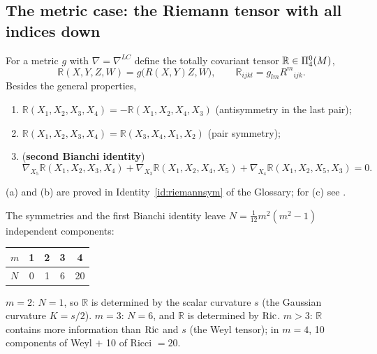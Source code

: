 \subsection{The metric case: the Riemann tensor with all indices down}
\begin{formal}
For a metric $g$ with $\nabla=\nabla^{LC}$ define the totally covariant tensor $\mathbb R\in\Pi^{0}_{4}(M)$,
\[
\mathbb R(X,Y,Z,W)=g\big(R(X,Y)Z,W\big),\qquad \mathbb R_{ijkl}=g_{lm}R^m{}_{ijk}.
\]
Besides the general properties,
\begin{enumerate}[nosep,label=(\alph*)]
\item $\mathbb R(X_1,X_2,X_3,X_4)=-\mathbb R(X_1,X_2,X_4,X_3)$ (antisymmetry in the last pair);
\item $\mathbb R(X_1,X_2,X_3,X_4)=\mathbb R(X_3,X_4,X_1,X_2)$ (pair symmetry);
\item (\textbf{second Bianchi identity}) \[\nabla_{X_5}\mathbb R(X_1,X_2,X_3,X_4)+\nabla_{X_3}\mathbb R(X_1,X_2,X_4,X_5)+\nabla_{X_4}\mathbb R(X_1,X_2,X_5,X_3)=0.\]
\end{enumerate}
(a) and (b) are proved in Identity~\ref{id:riemannsym} of the Glossary; for (c) see \cite{Lee}.%
\end{formal}

\begin{formal}
The symmetries and the first Bianchi identity leave $N=\frac1{12}m^2(m^2-1)$ independent components:
\begin{center}
\begin{tabular}{@{}lcccc@{}}
\toprule
$m$ & 1 & 2 & 3 & 4\\ \midrule
$N$ & 0 & 1 & 6 & 20\\ \bottomrule
\end{tabular}
\end{center}
$m=2$: $N=1$, so $\mathbb R$ is determined by the scalar curvature $s$ (the Gaussian curvature $K=s/2$). $m=3$: $N=6$, and $\mathbb R$ is determined by $\operatorname{Ric}$. $m>3$: $\mathbb R$ contains more information than $\operatorname{Ric}$ and $s$ (the Weyl tensor); in $m=4$, 10 components of Weyl $+$ 10 of Ricci $=20$.
\end{formal}

